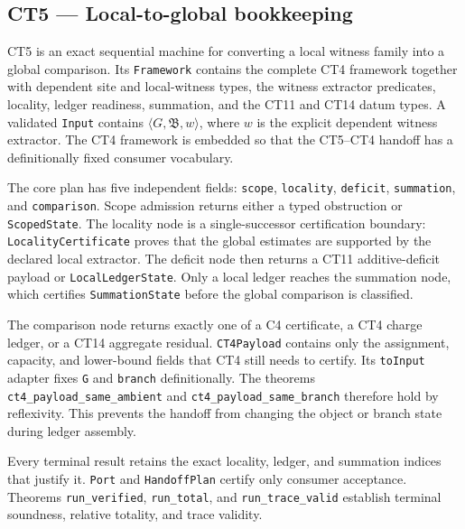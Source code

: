 \subsection{CT5 --- Local-to-global bookkeeping}\label{ct:5}\label{the-local-versus-global-rationale}

CT5 is an exact sequential machine for converting a local witness family into
a global comparison.  Its \texttt{Framework} contains the complete CT4
framework together with dependent site and local-witness types, the witness
extractor predicates, locality, ledger readiness, summation, and the CT11 and
CT14 datum types.  A validated \texttt{Input} contains
\(\langle G,\mathfrak B,w\rangle\), where \(w\) is the explicit dependent
witness extractor.  The CT4 framework is embedded so that the CT5--CT4
handoff has a definitionally fixed consumer vocabulary.

The core plan has five independent fields:
\texttt{scope}, \texttt{locality}, \texttt{deficit},
\texttt{summation}, and \texttt{comparison}.  Scope admission returns either a
typed obstruction or \texttt{ScopedState}.  The locality node is a
single-successor certification boundary: \texttt{LocalityCertificate} proves
that the global estimates are supported by the declared local extractor.
The deficit node then returns a CT11 additive-deficit payload or
\texttt{LocalLedgerState}.  Only a local ledger reaches the summation node,
which certifies \texttt{SummationState} before the global comparison is
classified.

The comparison node returns exactly one of a C4 certificate, a CT4 charge
ledger, or a CT14 aggregate residual.  \texttt{CT4Payload} contains only the
assignment, capacity, and lower-bound fields that CT4 still needs to certify.
Its \texttt{toInput} adapter fixes \texttt{G} and \texttt{branch}
definitionally.  The theorems \texttt{ct4\_payload\_same\_ambient} and
\texttt{ct4\_payload\_same\_branch} therefore hold by reflexivity.  This
prevents the handoff from changing the object or branch state during ledger
assembly.

Every terminal result retains the exact locality, ledger, and summation
indices that justify it.  \texttt{Port} and \texttt{HandoffPlan} certify only
consumer acceptance.  Theorems \texttt{run\_verified}, \texttt{run\_total},
and \texttt{run\_trace\_valid} establish terminal soundness, relative
totality, and trace validity.

